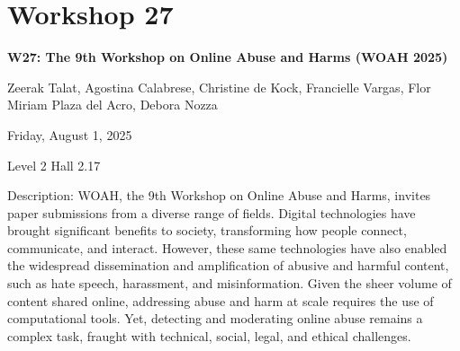 \clearpage


\section[W27: The 9th Workshop on Online Abuse and Harms (WOAH 2025) ]{Workshop 27}

\begin{center}
    {\Large \textbf{W27: The 9th Workshop on Online Abuse and Harms (WOAH 2025) }}

Zeerak Talat, Agostina Calabrese, Christine de Kock, Francielle Vargas, Flor Miriam Plaza del Acro, Debora Nozza

    Friday, August 1, 2025

Level 2 Hall 2.17

\end{center}

Description: WOAH, the 9th Workshop on Online Abuse and Harms, invites paper submissions from a diverse range of fields. Digital technologies have brought significant benefits to society, transforming how people connect, communicate, and interact. However, these same technologies have also enabled the widespread dissemination and amplification of abusive and harmful content, such as hate speech, harassment, and misinformation. Given the sheer volume of content shared online, addressing abuse and harm at scale requires the use of computational tools. Yet, detecting and moderating online abuse remains a complex task, fraught with technical, social, legal, and ethical challenges. 

